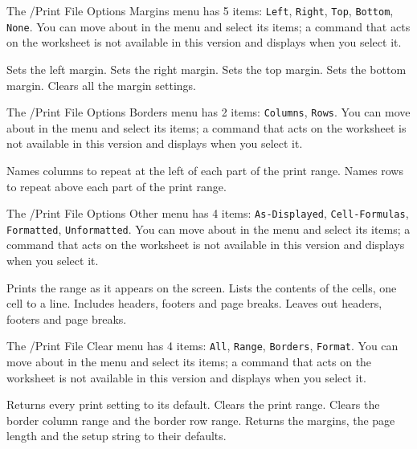 The /Print File Options Margins menu has 5 items: \texttt{Left}, \texttt{Right}, \texttt{Top}, \texttt{Bottom}, \texttt{None}.  You can move about in the menu and select its items; a command that acts on the worksheet is not available in this version and displays  when you select it.
\begin{Options}
 Sets the left margin.
 Sets the right margin.
 Sets the top margin.
 Sets the bottom margin.
 Clears all the margin settings.
\end{Options}

The /Print File Options Borders menu has 2 items: \texttt{Columns}, \texttt{Rows}.  You can move about in the menu and select its items; a command that acts on the worksheet is not available in this version and displays  when you select it.
\begin{Options}
 Names columns to repeat at the left of each part of the print range.
 Names rows to repeat above each part of the print range.
\end{Options}

The /Print File Options Other menu has 4 items: \texttt{As-Displayed}, \texttt{Cell-Formulas}, \texttt{Formatted}, \texttt{Unformatted}.  You can move about in the menu and select its items; a command that acts on the worksheet is not available in this version and displays  when you select it.
\begin{Options}
 Prints the range as it appears on the screen.
 Lists the contents of the cells, one cell to a line.
 Includes headers, footers and page breaks.
 Leaves out headers, footers and page breaks.
\end{Options}

The /Print File Clear menu has 4 items: \texttt{All}, \texttt{Range}, \texttt{Borders}, \texttt{Format}.  You can move about in the menu and select its items; a command that acts on the worksheet is not available in this version and displays  when you select it.
\begin{Options}
 Returns every print setting to its default.
 Clears the print range.
 Clears the border column range and the border row range.
 Returns the margins, the page length and the setup string to their defaults.
\end{Options}
